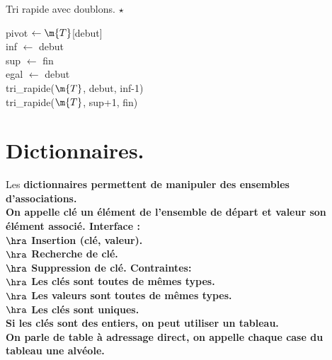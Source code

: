 \documentclass[french, 11pt]{article}
\begin{document}
\begin{defi}{Tri rapide avec doublons. $\star$}{}
    \begin{algorithm}[H]
        \caption{Tri rapide avec doublons}
        pivot $\gets \m{T}$[debut]\\
        inf $\gets$ debut\\
        sup $\gets$ fin\\
        egal $\gets$ debut\\
        tri\_rapide($\m{T}$, debut, inf-1)\\
        tri\_rapide($\m{T}$, sup+1, fin)
    \end{algorithm}
\end{defi}

\section{Dictionnaires.}

\begin{defi}{}{}
    Les \bf{dictionnaires} permettent de manipuler des ensembles d'associations.\\
    On appelle \bf{clé} un élément de l'ensemble de départ et \bf{valeur} son élément associé. Interface :\\
    $\hra$ \bf{Insertion} (clé, valeur).\\
    $\hra$ \bf{Recherche} de clé.\\
    $\hra$ \bf{Suppression} de clé.\n
    Contraintes:\\
    $\hra$ Les clés sont toutes de mêmes types.\\
    $\hra$ Les valeurs sont toutes de mêmes types.\\
    $\hra$ Les clés sont uniques.\\
    Si les clés sont des entiers, on peut utiliser un tableau.\\
    On parle de table à adressage direct, on appelle chaque case du tableau une \bf{alvéole}.
\end{defi}
\end{document}
